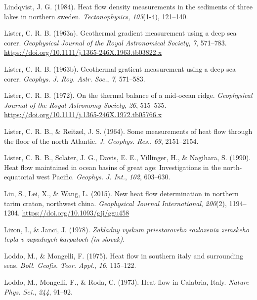 \begin{CSLReferences}{1}{1}
\leavevmode{}%
Lindqvist, J. G. (1984). Heat flow density measurements in the sediments of three lakes in northern sweden. \emph{Tectonophysics}, \emph{103}(1-4), 121--140.

\leavevmode{}%
Lister, C. R. B. (1963a). Geothermal gradient measurement using a deep sea corer. \emph{Geophysical Journal of the Royal Astronomical Society}, \emph{7}, 571--783. \url{https://doi.org/10.1111/j.1365-246X.1963.tb03822.x}

\leavevmode{}%
Lister, C. R. B. (1963b). Geothermal gratient measurement using a deep sea corer. \emph{Geophys. J. Roy. Astr. Soc.}, \emph{7}, 571--583.

\leavevmode{}%
Lister, C. R. B. (1972). On the thermal balance of a mid-ocean ridge. \emph{Geophysical Journal of the Royal Astronomy Society}, \emph{26}, 515--535. \url{https://doi.org/10.1111/j.1365-246X.1972.tb05766.x}

\leavevmode{}%
Lister, C. R. B., \& Reitzel, J. S. (1964). Some measurements of heat flow through the floor of the north {Atlantic}. \emph{J. Geophys. Res.}, \emph{69}, 2151--2154.

\leavevmode{}%
Lister, C. R. B., Sclater, J. G., Davis, E. E., Villinger, H., \& Nagihara, S. (1990). Heat flow maintained in ocean basins of great age: Investigations in the north-equatorial west {Pacific}. \emph{Geophys. J. Int.}, \emph{102}, 603--630.

\leavevmode{}%
Liu, S., Lei, X., \& Wang, L. (2015). New heat flow determination in northern tarim craton, northwest china. \emph{Geophysical Journal International}, \emph{200}(2), 1194--1204. \url{https://doi.org/10.1093/gji/ggu458}

\leavevmode{}%
Lizon, I., \& Janci, J. (1978). \emph{Zakladny vyskum priestoroveho rozlozenia zemskeho tepla v zapadnych karpatoch (in slovak)}.

\leavevmode{}%
Loddo, M., \& Mongelli, F. (1975). Heat flow in southern italy and surrounding seas. \emph{Boll. Geofis. Teor. Appl.}, \emph{16}, 115--122.

\leavevmode{}%
Loddo, M., Mongelli, F., \& Roda, C. (1973). Heat flow in {Calabria, Italy}. \emph{Nature Phys. Sci.}, \emph{244}, 91--92.


\end{CSLReferences}
